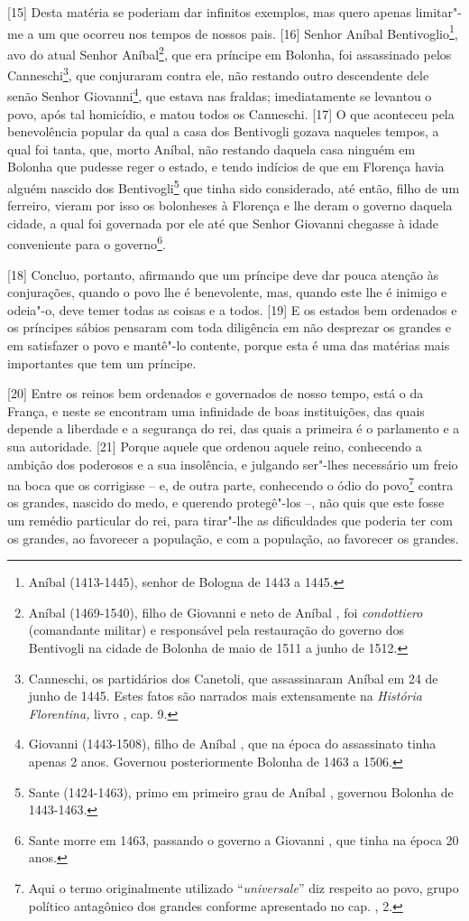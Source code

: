 {[}15{]} Desta
matéria se poderiam dar infinitos exemplos, mas quero apenas limitar"-me
a um que ocorreu nos tempos de nossos pais. {[}16{]} Senhor Aníbal
Bentivoglio\footnote{Aníbal  (1413-1445), senhor de Bologna de 1443 a
  1445.}, avo do atual Senhor Aníbal\footnote{Aníbal  (1469-1540),
  filho de Giovanni  e neto de Aníbal , foi \emph{condottiero}
  (comandante militar) e responsável pela restauração do governo dos
  Bentivogli na cidade de Bolonha de maio de 1511 a junho de 1512.}, que
era príncipe em Bolonha, foi assassinado pelos Canneschi\footnote{Canneschi,
  os partidários dos Canetoli, que assassinaram Aníbal  em 24 de junho
  de 1445. Estes fatos são narrados mais extensamente na \emph{História
  Florentina,} livro , cap. 9.}, que conjuraram contra ele, não
restando outro descendente dele senão Senhor Giovanni\footnote{Giovanni
   (1443-1508), filho de Aníbal , que na época do assassinato tinha
  apenas 2 anos. Governou posteriormente Bolonha de 1463 a 1506.}, que
estava nas fraldas; imediatamente se levantou o povo, após tal
homicídio, e matou todos os Canneschi. {[}17{]} O que aconteceu pela
benevolência popular da qual a casa dos Bentivogli gozava naqueles
tempos, a qual foi tanta, que, morto Aníbal, não restando daquela casa
ninguém em Bolonha que pudesse reger o estado, e tendo indícios de que
em Florença havia alguém nascido dos Bentivogli\footnote{Sante
  (1424-1463), primo em primeiro grau de Aníbal , governou Bolonha de
  1443-1463.} que tinha sido considerado, até então, filho de um
ferreiro, vieram por isso os bolonheses à Florença e lhe deram o governo
daquela cidade, a qual foi governada por ele até que Senhor Giovanni
chegasse à idade conveniente para o governo\footnote{Sante morre em
  1463, passando o governo a Giovanni , que tinha na época 20 anos.}.

{[}18{]} Concluo, portanto, afirmando que um príncipe deve dar pouca
atenção às conjurações, quando o povo lhe é benevolente, mas, quando
este lhe é inimigo e odeia"-o, deve temer todas as coisas e a todos.
{[}19{]} E os estados bem ordenados e os príncipes sábios pensaram com
toda diligência em não desprezar os grandes e em satisfazer o povo e
mantê"-lo contente, porque esta é uma das matérias mais importantes que
tem um príncipe.

{[}20{]} Entre os reinos bem ordenados e governados de nosso tempo, está
o da França, e neste se encontram uma infinidade de boas instituições,
das quais depende a liberdade e a segurança do rei, das quais a primeira
é o parlamento e a sua autoridade. {[}21{]} Porque aquele que ordenou
aquele reino, conhecendo a ambição dos poderosos e a sua insolência, e
julgando ser"-lhes necessário um freio na boca que os corrigisse -- e, de
outra parte, conhecendo o ódio do povo\footnote{Aqui o termo
  originalmente utilizado ``\emph{universale}'' diz respeito ao povo,
  grupo político antagônico dos grandes conforme apresentado no cap. ,
  2.} contra os grandes, nascido do medo, e querendo protegê"-los --, não
quis que este fosse um remédio particular do rei, para tirar"-lhe as
dificuldades que poderia ter com os grandes, ao favorecer a população, e
com a população, ao favorecer os grandes.

